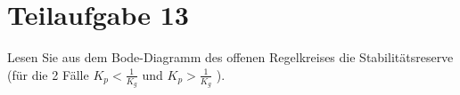 \section{Teilaufgabe 13}
\begin{aufgabe}
    Lesen Sie aus dem Bode-Diagramm des offenen Regelkreises die 
    Stabilitätsreserve (für die 2 Fälle $K_p < \frac{1}{K_g}$ und 
    $K_p > \frac{1}{K_g}$ ).
\end{aufgabe}
